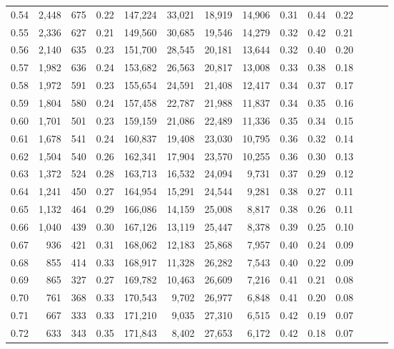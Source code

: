 \begin{tabular}{rrrrrrrrrrrrrr}
0.54 &  2,448 &  675 &  0.22 &  147,224 &   33,021 &  18,919 &  14,906 &  0.31 &  0.44 &      0.22 \\
0.55 &  2,336 &  627 &  0.21 &  149,560 &   30,685 &  19,546 &  14,279 &  0.32 &  0.42 &      0.21 \\
0.56 &  2,140 &  635 &  0.23 &  151,700 &   28,545 &  20,181 &  13,644 &  0.32 &  0.40 &      0.20 \\
0.57 &  1,982 &  636 &  0.24 &  153,682 &   26,563 &  20,817 &  13,008 &  0.33 &  0.38 &      0.18 \\
0.58 &  1,972 &  591 &  0.23 &  155,654 &   24,591 &  21,408 &  12,417 &  0.34 &  0.37 &      0.17 \\
0.59 &  1,804 &  580 &  0.24 &  157,458 &   22,787 &  21,988 &  11,837 &  0.34 &  0.35 &      0.16 \\
0.60 &  1,701 &  501 &  0.23 &  159,159 &   21,086 &  22,489 &  11,336 &  0.35 &  0.34 &      0.15 \\
0.61 &  1,678 &  541 &  0.24 &  160,837 &   19,408 &  23,030 &  10,795 &  0.36 &  0.32 &      0.14 \\
0.62 &  1,504 &  540 &  0.26 &  162,341 &   17,904 &  23,570 &  10,255 &  0.36 &  0.30 &      0.13 \\
0.63 &  1,372 &  524 &  0.28 &  163,713 &   16,532 &  24,094 &   9,731 &  0.37 &  0.29 &      0.12 \\
0.64 &  1,241 &  450 &  0.27 &  164,954 &   15,291 &  24,544 &   9,281 &  0.38 &  0.27 &      0.11 \\
0.65 &  1,132 &  464 &  0.29 &  166,086 &   14,159 &  25,008 &   8,817 &  0.38 &  0.26 &      0.11 \\
0.66 &  1,040 &  439 &  0.30 &  167,126 &   13,119 &  25,447 &   8,378 &  0.39 &  0.25 &      0.10 \\
0.67 &    936 &  421 &  0.31 &  168,062 &   12,183 &  25,868 &   7,957 &  0.40 &  0.24 &      0.09 \\
0.68 &    855 &  414 &  0.33 &  168,917 &   11,328 &  26,282 &   7,543 &  0.40 &  0.22 &      0.09 \\
0.69 &    865 &  327 &  0.27 &  169,782 &   10,463 &  26,609 &   7,216 &  0.41 &  0.21 &      0.08 \\
0.70 &    761 &  368 &  0.33 &  170,543 &    9,702 &  26,977 &   6,848 &  0.41 &  0.20 &      0.08 \\
0.71 &    667 &  333 &  0.33 &  171,210 &    9,035 &  27,310 &   6,515 &  0.42 &  0.19 &      0.07 \\
0.72 &    633 &  343 &  0.35 &  171,843 &    8,402 &  27,653 &   6,172 &  0.42 &  0.18 &      0.07 \\

\end{tabular}
